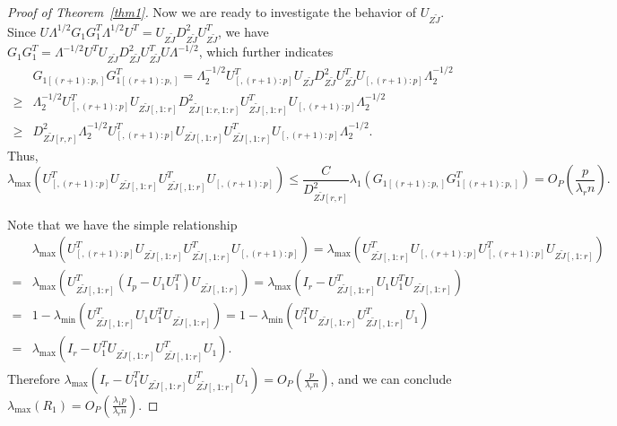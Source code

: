 \documentclass[review]{elsarticle}
\theoremstyle{plain}
\theoremstyle{definition}
\theoremstyle{remark}
\begin{document}
\begin{proof}[\textrm{Proof of Theorem~\ref{thm1}}]
Now we are ready to investigate the behavior of $U_{Z\tilde{J}}$.
Since
$
U\Lambda^{1/2} G_1 G_1^T \Lambda^{1/2} U^T 
=U_{Z\tilde{J}}D_{Z\tilde{J}}^2 U_{Z\tilde{J}}^T
$,
we have
$
G_1 G_1^T  
=\Lambda^{-1/2} U^T U_{Z\tilde{J}}D_{Z\tilde{J}}^2 U_{Z\tilde{J}}^TU\Lambda^{-1/2}
$, which further indicates
$$
\begin{aligned}
&G_{1[(r+1):p,]} G_{1[(r+1):p,]}^T  
=\Lambda_{2}^{-1/2} U_{[,(r+1):p]}^T U_{Z\tilde{J}}D_{Z\tilde{J}}^2 U_{Z\tilde{J}}^T U_{[,(r+1):p]}\Lambda_{2}^{-1/2}\\
\geq&
\Lambda_{2}^{-1/2} U_{[,(r+1):p]}^T U_{Z\tilde{J}[,1:r]}D_{Z\tilde{J}[1:r,1:r]}^2 U_{Z\tilde{J}[,1:r]}^T U_{[,(r+1):p]}\Lambda_{2}^{-1/2}\\
\geq&
D_{Z\tilde{J}[r,r]}^2
\Lambda_{2}^{-1/2} U_{[,(r+1):p]}^T U_{Z\tilde{J}[,1:r]} U_{Z\tilde{J}[,1:r]}^T U_{[,(r+1):p]}\Lambda_{2}^{-1/2}.
\end{aligned}
$$
Thus,
$$
\lambda_{\max}(U_{[,(r+1):p]}^T U_{Z\tilde{J}[,1:r]} U_{Z\tilde{J}[,1:r]}^T U_{[,(r+1):p]})\leq 
\frac{C}{D^2_{Z\tilde{J}[r,r]}} \lambda_{1}
(G_{1[(r+1):p,]} G_{1[(r+1):p,]}^T)
=O_P(\frac{p}{\lambda_r n}).
$$

Note that we have the simple relationship
$$
\begin{aligned}
&\lambda_{\max}(U_{[,(r+1):p]}^T U_{Z\tilde{J}[,1:r]} U_{Z\tilde{J}[,1:r]}^T U_{[,(r+1):p]})
=
\lambda_{\max}( U_{Z\tilde{J}[,1:r]}^T U_{[,(r+1):p]}U_{[,(r+1):p]}^T U_{Z\tilde{J}[,1:r]})\\
=&
\lambda_{\max}( U_{Z\tilde{J}[,1:r]}^T (I_p- U_1 U_1^T) U_{Z\tilde{J}[,1:r]})=
\lambda_{\max}(I_r- U_{Z\tilde{J}[,1:r]}^T  U_1 U_1^T U_{Z\tilde{J}[,1:r]})\\
=&
1-\lambda_{\min}( U_{Z\tilde{J}[,1:r]}^T  U_1 U_1^T U_{Z\tilde{J}[,1:r]})
=
1-\lambda_{\min}(U_1^T U_{Z\tilde{J}[,1:r]}U_{Z\tilde{J}[,1:r]}^T U_1)\\
=&
\lambda_{\max}(I_r-U_1^T U_{Z\tilde{J}[,1:r]}U_{Z\tilde{J}[,1:r]}^T U_1).
\end{aligned}
$$
Therefore 
$
\lambda_{\max}(I_r-U_1^T U_{Z\tilde{J}[,1:r]}U_{Z\tilde{J}[,1:r]}^T U_1)
=O_P(\frac{ p}{\lambda_r n})
$, and we can conclude
$\lambda_{\max}(R_1)=O_P(\frac{\lambda_1 p}{\lambda_r n})$.


\end{proof}
\end{document}
